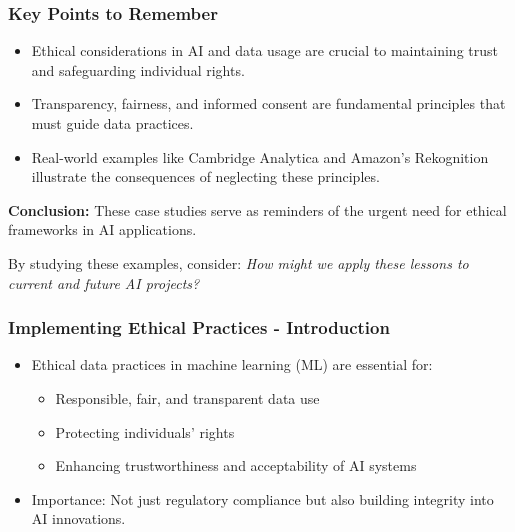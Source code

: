 \documentclass[aspectratio=169]{beamer}
\begin{document}
\begin{frame}[fragile]
    \frametitle{Key Points to Remember}
    
    \begin{itemize}
        \item Ethical considerations in AI and data usage are crucial to maintaining trust and safeguarding individual rights.
        \item Transparency, fairness, and informed consent are fundamental principles that must guide data practices.
        \item Real-world examples like Cambridge Analytica and Amazon's Rekognition illustrate the consequences of neglecting these principles.
    \end{itemize}
    
    \textbf{Conclusion:} 
    These case studies serve as reminders of the urgent need for ethical frameworks in AI applications. 

    By studying these examples, consider: \textit{How might we apply these lessons to current and future AI projects?}
\end{frame}

\begin{frame}[fragile]
    \frametitle{Implementing Ethical Practices - Introduction}
    \begin{itemize}
        \item Ethical data practices in machine learning (ML) are essential for:
        \begin{itemize}
            \item Responsible, fair, and transparent data use
            \item Protecting individuals' rights
            \item Enhancing trustworthiness and acceptability of AI systems
        \end{itemize}
        \item Importance: Not just regulatory compliance but also building integrity into AI innovations.
    \end{itemize}
\end{frame}
\end{document}
